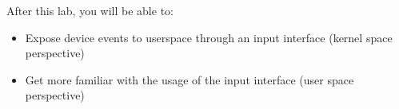 
After this lab, you will be able to:

\begin{itemize}
\item Expose device events to userspace through an input interface
      (kernel space perspective)
\item Get more familiar with the usage of the input interface
      (user space perspective)
\end{itemize}

